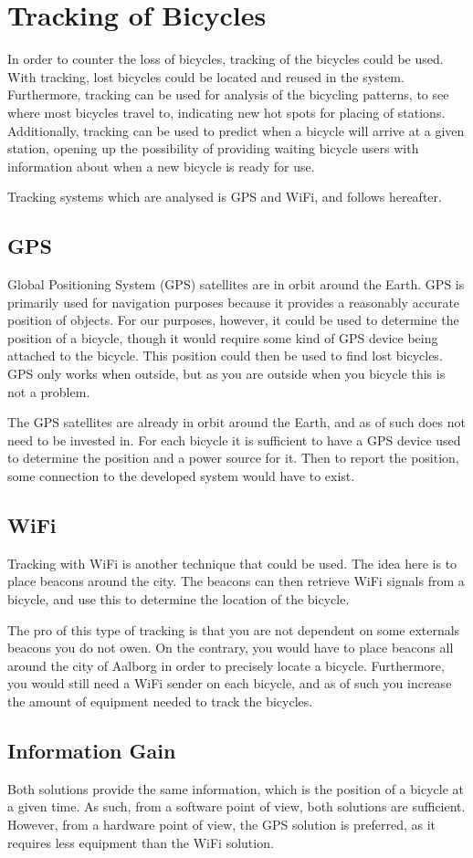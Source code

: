 \section{Tracking of Bicycles}
In order to counter the loss of bicycles, tracking of the bicycles could be used.
With tracking, lost bicycles could be located and reused in the system.
Furthermore, tracking can be used for analysis of the bicycling patterns, to see where most bicycles travel to, indicating new hot spots for placing of stations.
Additionally, tracking can be used to predict when a bicycle will arrive at a given station, opening up the possibility of providing waiting bicycle users with information about when a new bicycle is ready for use.

Tracking systems which are analysed is GPS and WiFi, and follows hereafter.
\subsection{GPS}
Global Positioning System (GPS) satellites are in orbit around the Earth.
GPS is primarily used for navigation purposes because it provides a reasonably accurate position of objects.
For our purposes, however, it could be used to determine the position of a bicycle, though it would require some kind of GPS device being attached to the bicycle.
This position could then be used to find lost bicycles.
GPS only works when outside, but as you are outside when you bicycle this is not a problem.

The GPS satellites are already in orbit around the Earth, and as of such does not need to be invested in. %
For each bicycle it is sufficient to have a GPS device used to determine the position and a power source for it.
Then to report the position, some connection to the developed system would have to exist.

\subsection{WiFi}
Tracking with WiFi is another technique that could be used.
The idea here is to place beacons around the city.
The beacons can then retrieve WiFi signals from a bicycle, and use this to determine the location of the bicycle.

The pro of this type of tracking is that you are not dependent on some externals beacons you do not owen.
On the contrary, you would have to place beacons all around the city of Aalborg in order to precisely locate a bicycle.
Furthermore, you would still need a WiFi sender on each bicycle, and as of such you increase the amount of equipment needed to track the bicycles.

\subsection{Information Gain}
Both solutions provide the same information, which is the position of a bicycle at a given time.
As such, from a software point of view, both solutions are sufficient.
However, from a hardware point of view, the GPS solution is preferred, as it requires less equipment than the WiFi solution.